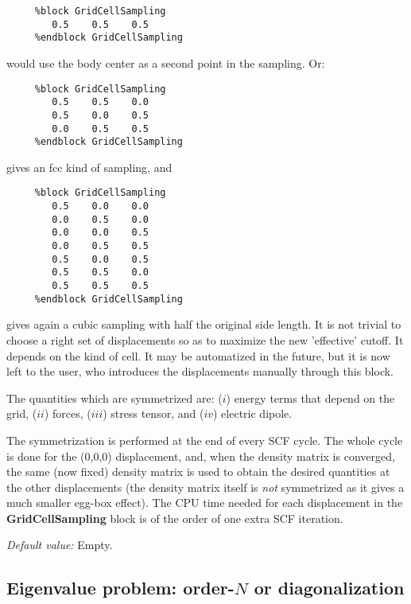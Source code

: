 \documentclass[11pt]{article}
\begin{document}
\begin{description}
\begin{verbatim}
     %block GridCellSampling
        0.5    0.5    0.5
     %endblock GridCellSampling
\end{verbatim}

would use the body center as a second point in the sampling. Or:


\begin{verbatim}
     %block GridCellSampling
        0.5    0.5    0.0
        0.5    0.0    0.5
        0.0    0.5    0.5
     %endblock GridCellSampling
\end{verbatim}

gives an fcc kind of sampling, and


\begin{verbatim}
     %block GridCellSampling
        0.5    0.0    0.0
        0.0    0.5    0.0
        0.0    0.0    0.5
        0.0    0.5    0.5
        0.5    0.0    0.5
        0.5    0.5    0.0
        0.5    0.5    0.5
     %endblock GridCellSampling
\end{verbatim}

gives again a cubic sampling with half the original side length.
It is not trivial to choose a right set of displacements so as
to maximize the new 'effective' cutoff. It depends on the 
kind of cell. It may be automatized in the future, but it 
is now left to the user, who introduces the displacements
manually through this block.

The quantities which are symmetrized are: ($i$) energy terms
that depend on the grid, ($ii$) forces, ($iii$) stress
tensor, and ($iv$) electric dipole.

The symmetrization is performed at the end of every SCF cycle. The 
whole cycle is done for the (0,0,0) displacement, and, when the
density matrix is converged, the same (now fixed)
density matrix is used to obtain the desired quantities at the 
other displacements (the density matrix itself is {\it not}
symmetrized as it gives a much smaller egg-box effect).
The CPU time needed for each displacement
in the {\bf GridCellSampling} block
is of the order of one extra SCF iteration.

{\it Default value:} Empty.

\end{description}



\vspace{5pt}
\subsection{Eigenvalue problem: order-$N$ or diagonalization}
\end{document}
